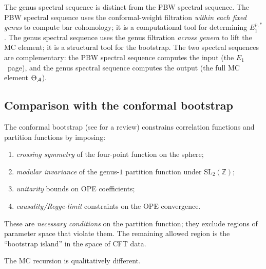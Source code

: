 \begin{remark}
The genus spectral sequence is distinct from the PBW spectral
sequence. The PBW spectral sequence uses the conformal-weight
filtration \emph{within each fixed genus} to compute bar
cohomology; it is a computational tool for determining
$E_1^{p,*}$. The genus spectral sequence uses the genus
filtration \emph{across genera} to lift the MC element; it is
a structural tool for the bootstrap. The two spectral sequences
are complementary: the PBW spectral sequence computes the input
(the $E_1$~page), and the genus spectral sequence computes the
output (the full MC element $\Theta_{\mathcal{A}}$).
\end{remark}

%
%

\subsection{Comparison with the conformal bootstrap}

The conformal bootstrap (see \cite{BPRS15} for a review)
constrains correlation functions and partition functions by
imposing:
\begin{enumerate}[label=(\alph*)]
\item \emph{crossing symmetry} of the four-point function on the
 sphere;
\item \emph{modular invariance} of the genus-$1$ partition
 function under $\mathrm{SL}_2(\mathbb{Z})$;
\item \emph{unitarity} bounds on OPE coefficients;
\item \emph{causality/Regge-limit} constraints on the OPE
 convergence.
\end{enumerate}
These are \emph{necessary conditions} on the partition function;
they exclude regions of parameter space that violate them. The
remaining allowed region is the
``bootstrap island'' in the space of CFT data.

The MC recursion is qualitatively different.

